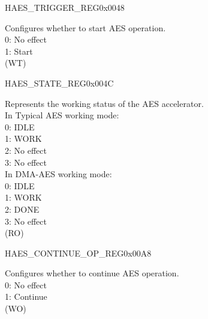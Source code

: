 \begin{register}{H}{AES\_TRIGGER\_REG}{0x0048}\label{regdesc:AESTRIGGERREG}
%
%
\regnewline%
\begin{regdesc}\begin{reglist}
\item [AES\_TRIGGER] Configures whether to start AES operation. \\
0: No effect\\
1: Start\\
(WT)
\end{reglist}\end{regdesc}
\end{register}


\begin{register}{H}{AES\_STATE\_REG}{0x004C}\label{regdesc:AESSTATEREG}
%
%
\regnewline%
\begin{regdesc}\begin{reglist}
\item [AES\_STATE] Represents the working status of the AES accelerator. \\
In Typical AES working mode:\\
0: IDLE\\
1: WORK\\
2: No effect\\
3: No effect\\
In DMA-AES working mode:\\
0: IDLE\\
1: WORK\\
2: DONE\\
3: No effect\\
(RO)
\end{reglist}\end{regdesc}
\end{register}


\begin{register}{H}{AES\_CONTINUE\_OP\_REG}{0x00A8}\label{regdesc:AESCONTINUEOPREG}
%
%
\regnewline%
\begin{regdesc}\begin{reglist}
\item [AES\_CONTINUE\_OP] Configures whether to continue AES operation.\\
0: No effect\\
1: Continue \\ (WO)
\end{reglist}\end{regdesc}
\end{register}


